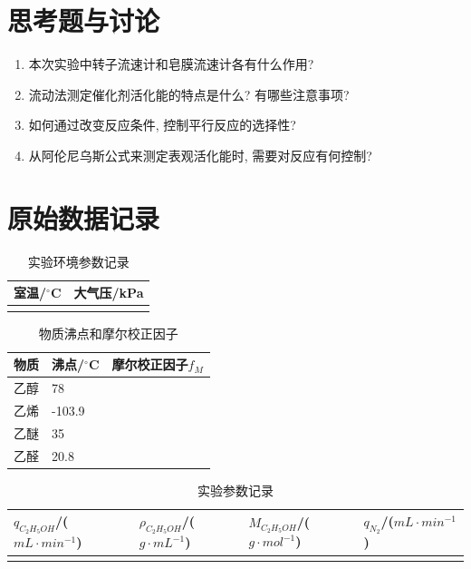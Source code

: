 \documentclass[a4paper]{article}
\begin{document}
\section{思考题与讨论}
\begin{enumerate}
	\item 本次实验中转子流速计和皂膜流速计各有什么作用?
	\item 流动法测定催化剂活化能的特点是什么? 有哪些注意事项?
	\item 如何通过改变反应条件, 控制平行反应的选择性?
	\item 从阿伦尼乌斯公式来测定表观活化能时, 需要对反应有何控制?
\end{enumerate}
\newpage
\section{原始数据记录}
\begin{table}[H]
	\begin{center}
		\begin{tabular}{l|l}
			\hline
			室温/$^\circ$C & 大气压/kPa\\
			\hline
						   &           \\
			\hline
		 \end{tabular}
	\end{center}
	\caption{实验环境参数记录}
\end{table}
\begin{table}[H]
	\begin{center}
		\begin{tabular}{l|l|l}
			\hline
			物质& 沸点/$^\circ$C & 摩尔校正因子$f_{M}$\\
			\hline
			乙醇&   78      &	\\
			\hline
			乙烯&  -103.9   &	\\
			\hline
			乙醚&  35       &	\\
			\hline
			乙醛&  20.8     &	\\
			\hline
		 \end{tabular}
	\end{center}
	\caption{物质沸点和摩尔校正因子}
\end{table}
\begin{table}[H]
	\begin{center}
		\begin{tabular}{l|l|l|l}
			\hline
			$q_{C_{2}H_{5}OH}$/($mL\cdot min^{-1}$) & $\rho_{C_{2}H_{5}OH}$/($g\cdot mL^{-1}$) 
			& $M_{C_{2}H_{5}OH}$/($g\cdot mol^{-1}$) & $q_{N_{2}}$/($mL\cdot min^{-1}$)\\
			\hline
						                            &                                          
			&                                       &                                  \\
			\hline
			
		 \end{tabular}
	\end{center}
	\caption{实验参数记录}
\end{table}
\end{document}
